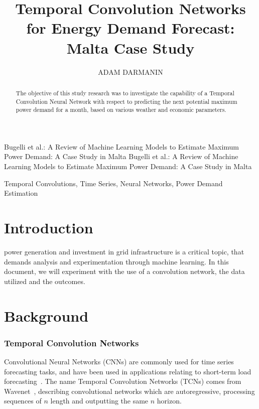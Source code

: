 \documentclass{ieeeaccess}
\begin{document}

\title{Temporal Convolution Networks for Energy Demand Forecast: Malta Case Study}
\author{\uppercase{Adam Darmanin}} 
\address[1]{Department of Artificial Intelligence, University of Malta (email: adam.darmanin.03@um.edu.mt)}



\markboth
{Bugelli et al.: A Review of Machine Learning Models to Estimate Maximum Power Demand: A Case Study in Malta}
{Bugelli et al.: A Review of Machine Learning Models to Estimate Maximum Power Demand: A Case Study in Malta}



\begin{abstract}
The objective of this study research was to investigate the capability of a Temporal Convolution Neural Network with respect to predicting the next potential maximum power demand for a month, based on various weather and economic parameters.
\end{abstract}

\begin{keywords}
Temporal Convolutions, Time Series, Neural Networks, Power Demand Estimation
\end{keywords}

\titlepgskip=-21pt

\maketitle

\section{Introduction}
\label{sec:introduction}

 power generation and investment in grid infrastructure is a critical topic, that demands analysis and experimentation through machine learning. In this document, we will experiment with the use of a convolution network, the data utilized and the outcomes.

\section{Background}
\label{sec:background}

\subsubsection{Temporal Convolution Networks}
Convolutional Neural Networks (CNNs) are commonly used for time series forecasting tasks, and have been used in applications relating to short-term load forecasting~\cite{Gasparin2022,Benitez2020}. The name Temporal Convolution Networks (TCNs) comes from Wavenet~\cite{Gasparin2022}, describing convolutional networks which are autoregressive, processing sequences of $n$ length and outputting the same $n$ horizon.
\end{document}
